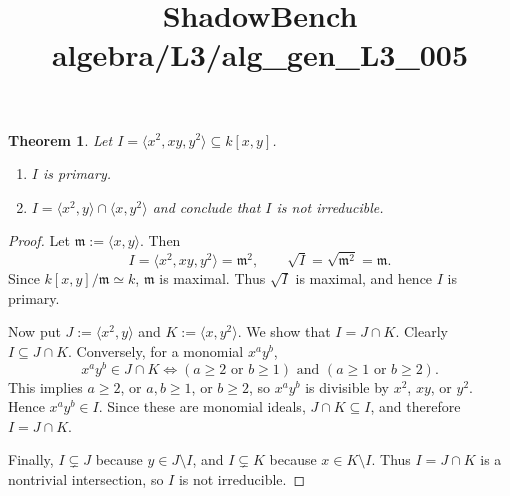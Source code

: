 \documentclass{article}
\title{ShadowBench algebra/L3/alg\_gen\_L3\_005}
\newtheorem{theorem}{Theorem}
\begin{document}
\maketitle

\begin{theorem}
Let $I = \langle x^2, xy, y^2 \rangle \subseteq k[x, y]$.
\begin{enumerate}
    \item[I_isPrimary] $I$ is primary.
    \item[I_not_infIrred] $I = \langle x^2, y \rangle \cap \langle x, y^2 \rangle$ and conclude that $I$ is not irreducible.
\end{enumerate}
\end{theorem}

\begin{proof}
Let $\mathfrak m:=\langle x,y\rangle$. Then
\[
  I=\langle x^2,xy,y^2\rangle=\mathfrak m^2,
  \qquad
  \sqrt I=\sqrt{\mathfrak m^2}=\mathfrak m.
\]
Since $k[x,y]/\mathfrak m\simeq k$, $\mathfrak m$ is maximal. Thus $\sqrt I$ is maximal, and hence $I$ is primary.

Now put $J:=\langle x^2,y\rangle$ and $K:=\langle x,y^2\rangle$. We show that $I=J\cap K$. Clearly $I\subseteq J\cap K$. Conversely, for a monomial $x^ay^b$,
\[
  x^ay^b\in J\cap K
  \iff
  (a\ge2 \text{ or } b\ge1)
  \text{ and }
  (a\ge1 \text{ or } b\ge2).
\]
This implies $a\ge2$, or $a,b\ge1$, or $b\ge2$, so $x^ay^b$ is divisible by $x^2$, $xy$, or $y^2$. Hence $x^ay^b\in I$. Since these are monomial ideals, $J\cap K\subseteq I$, and therefore $I=J\cap K$.

Finally, $I\subsetneq J$ because $y\in J\setminus I$, and $I\subsetneq K$ because $x\in K\setminus I$. Thus $I=J\cap K$ is a nontrivial intersection, so $I$ is not irreducible.
\end{proof}
\end{document}
